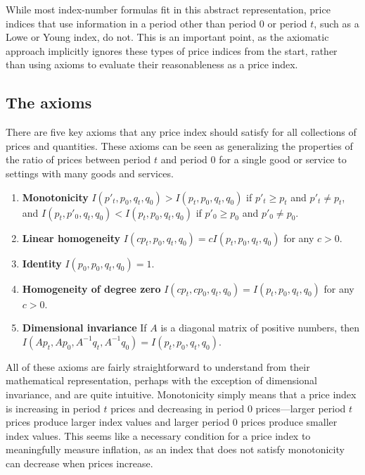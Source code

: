 \documentclass[
]{article}
\begin{document}
While most index-number formulas fit in this abstract representation, price indices that use information in a period other than period 0 or period \(t\), such as a Lowe or Young index, do not. This is an important point, as the axiomatic approach implicitly ignores these types of price indices from the start, rather than using axioms to evaluate their reasonableness as a price index.

\hypertarget{the-axioms}{%
\subsection{The axioms}\label{the-axioms}}

There are five key axioms that any price index should satisfy for all collections of prices and quantities. These axioms can be seen as generalizing the properties of the ratio of prices between period \(t\) and period 0 for a single good or service to settings with many goods and services.

\begin{enumerate}
\def\labelenumi{\arabic{enumi}.}
\item
  \textbf{Monotonicity} \(I(p'_{t}, p_{0}, q_{t}, q_{0}) > I(p_{t}, p_{0}, q_{t}, q_{0})\) if \(p'_{t} \geq p_{t}\) and \(p'_{t} \neq p_{t}\), and \(I(p_{t}, p'_{0}, q_{t}, q_{0}) < I(p_{t}, p_{0}, q_{t}, q_{0})\) if \(p'_{0} \geq p_{0}\) and \(p'_{0} \neq p_{0}\).
\item
  \textbf{Linear homogeneity} \(I(cp_{t}, p_{0}, q_{t}, q_{0}) = cI(p_{t}, p_{0}, q_{t}, q_{0})\) for any \(c > 0\).
\item
  \textbf{Identity} \(I(p_{0}, p_{0}, q_{t}, q_{0}) = 1\).
\item
  \textbf{Homogeneity of degree zero} \(I(cp_{t}, cp_{0}, q_{t}, q_{0}) = I(p_{t}, p_{0}, q_{t}, q_{0})\) for any \(c > 0\).
\item
  \textbf{Dimensional invariance} If \(A\) is a diagonal matrix of positive numbers, then \(I(Ap_{t}, Ap_{0}, A^{-1}q_{t}, A^{-1}q_{0}) = I(p_{t}, p_{0}, q_{t}, q_{0})\).
\end{enumerate}

All of these axioms are fairly straightforward to understand from their mathematical representation, perhaps with the exception of dimensional invariance, and are quite intuitive. Monotonicity simply means that a price index is increasing in period \(t\) prices and decreasing in period 0 prices---larger period \(t\) prices produce larger index values and larger period 0 prices produce smaller index values. This seems like a necessary condition for a price index to meaningfully measure inflation, as an index that does not satisfy monotonicity can decrease when prices increase.
\end{document}
